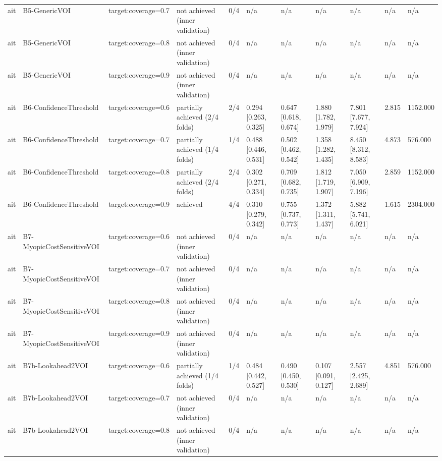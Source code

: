 \begin{table}[!ht]
{\begin{tabular}{lllllllllll}
ait & B5-GenericVOI & target:coverage=0.7 & not achieved (inner validation) & 0/4 & n/a & n/a & n/a & n/a & n/a & n/a \\
ait & B5-GenericVOI & target:coverage=0.8 & not achieved (inner validation) & 0/4 & n/a & n/a & n/a & n/a & n/a & n/a \\
ait & B5-GenericVOI & target:coverage=0.9 & not achieved (inner validation) & 0/4 & n/a & n/a & n/a & n/a & n/a & n/a \\
ait & B6-ConfidenceThreshold & target:coverage=0.6 & partially achieved (2/4 folds) & 2/4 & 0.294 [0.263, 0.325] & 0.647 [0.618, 0.674] & 1.880 [1.782, 1.979] & 7.801 [7.677, 7.924] & 2.815 & 1152.000 \\
ait & B6-ConfidenceThreshold & target:coverage=0.7 & partially achieved (1/4 folds) & 1/4 & 0.488 [0.446, 0.531] & 0.502 [0.462, 0.542] & 1.358 [1.282, 1.435] & 8.450 [8.312, 8.583] & 4.873 & 576.000 \\
ait & B6-ConfidenceThreshold & target:coverage=0.8 & partially achieved (2/4 folds) & 2/4 & 0.302 [0.271, 0.334] & 0.709 [0.682, 0.735] & 1.812 [1.719, 1.907] & 7.050 [6.909, 7.196] & 2.859 & 1152.000 \\
ait & B6-ConfidenceThreshold & target:coverage=0.9 & achieved & 4/4 & 0.310 [0.279, 0.342] & 0.755 [0.737, 0.773] & 1.372 [1.311, 1.437] & 5.882 [5.741, 6.021] & 1.615 & 2304.000 \\
ait & B7-MyopicCostSensitiveVOI & target:coverage=0.6 & not achieved (inner validation) & 0/4 & n/a & n/a & n/a & n/a & n/a & n/a \\
ait & B7-MyopicCostSensitiveVOI & target:coverage=0.7 & not achieved (inner validation) & 0/4 & n/a & n/a & n/a & n/a & n/a & n/a \\
ait & B7-MyopicCostSensitiveVOI & target:coverage=0.8 & not achieved (inner validation) & 0/4 & n/a & n/a & n/a & n/a & n/a & n/a \\
ait & B7-MyopicCostSensitiveVOI & target:coverage=0.9 & not achieved (inner validation) & 0/4 & n/a & n/a & n/a & n/a & n/a & n/a \\
ait & B7b-Lookahead2VOI & target:coverage=0.6 & partially achieved (1/4 folds) & 1/4 & 0.484 [0.442, 0.527] & 0.490 [0.450, 0.530] & 0.107 [0.091, 0.127] & 2.557 [2.425, 2.689] & 4.851 & 576.000 \\
ait & B7b-Lookahead2VOI & target:coverage=0.7 & not achieved (inner validation) & 0/4 & n/a & n/a & n/a & n/a & n/a & n/a \\
ait & B7b-Lookahead2VOI & target:coverage=0.8 & not achieved (inner validation) & 0/4 & n/a & n/a & n/a & n/a & n/a & n/a \\

\end{tabular}}
\end{table}

